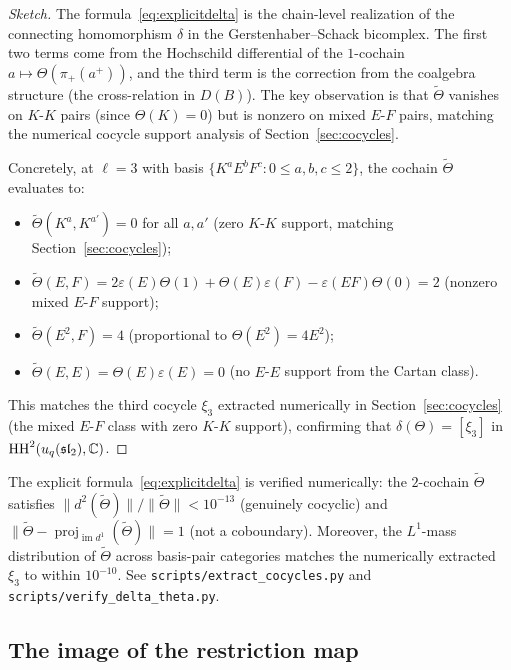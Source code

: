 \begin{proof}[Sketch]
The formula~\eqref{eq:explicitdelta} is the chain-level realization of the connecting homomorphism $\delta$ in the Gerstenhaber--Schack bicomplex. The first two terms come from the Hochschild differential of the $1$-cochain $a \mapsto \Theta(\pi_+(a^+))$, and the third term is the correction from the coalgebra structure (the cross-relation in $D(B)$). The key observation is that $\tilde\Theta$ vanishes on $K$-$K$ pairs (since $\Theta(K) = 0$) but is nonzero on mixed $E$-$F$ pairs, matching the numerical cocycle support analysis of Section~\ref{sec:cocycles}.

Concretely, at $\ell = 3$ with basis $\{K^a E^b F^c : 0 \leq a, b, c \leq 2\}$, the cochain $\tilde\Theta$ evaluates to:
\begin{itemize}
\item $\tilde\Theta(K^a, K^{a'}) = 0$ for all $a, a'$ (zero $K$-$K$ support, matching Section~\ref{sec:cocycles});
\item $\tilde\Theta(E, F) = 2 \varepsilon(E) \Theta(1) + \Theta(E) \varepsilon(F) - \varepsilon(EF) \Theta(0) = 2$ (nonzero mixed $E$-$F$ support);
\item $\tilde\Theta(E^2, F) = 4$ (proportional to $\Theta(E^2) = 4 E^2$);
\item $\tilde\Theta(E, E) = \Theta(E) \varepsilon(E) = 0$ (no $E$-$E$ support from the Cartan class).
\end{itemize}
This matches the third cocycle $\xi_3$ extracted numerically in Section~\ref{sec:cocycles} (the mixed $E$-$F$ class with zero $K$-$K$ support), confirming that $\delta(\Theta) = [\xi_3]$ in $\operatorname{HH}^2(u_q(\mathfrak{sl}_2), \mathbb{C})$.
\end{proof}

\begin{remark}[Verification]
The explicit formula~\eqref{eq:explicitdelta} is verified numerically: the $2$-cochain $\tilde\Theta$ satisfies $\|d^2(\tilde\Theta)\| / \|\tilde\Theta\| < 10^{-13}$ (genuinely cocyclic) and $\|\tilde\Theta - \operatorname{proj}_{\operatorname{im} d^1}(\tilde\Theta)\| = 1$ (not a coboundary). Moreover, the $L^1$-mass distribution of $\tilde\Theta$ across basis-pair categories matches the numerically extracted $\xi_3$ to within $10^{-10}$. See \texttt{scripts/extract\_cocycles.py} and \texttt{scripts/verify\_delta\_theta.py}.
\end{remark}

\subsection{The image of the restriction map}
\label{sec:imageproof}

